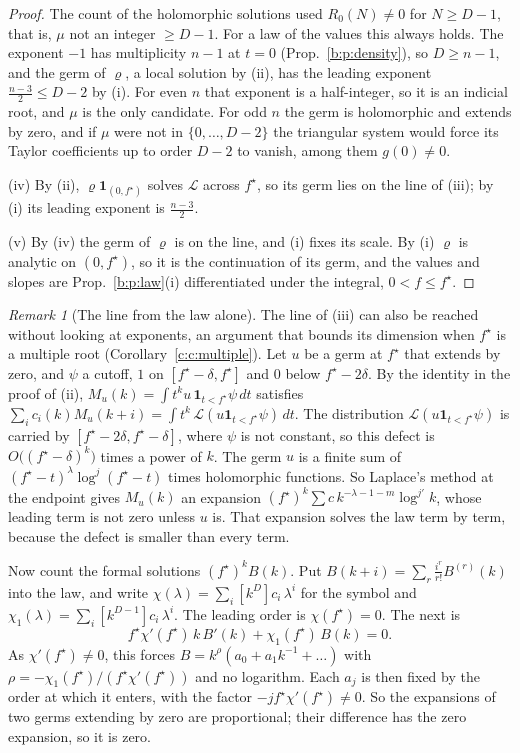 \documentclass[11pt]{article}
\newcommand{\one}{\mathbf 1}
\theoremstyle{plain}
\theoremstyle{definition}
\theoremstyle{remark}
\newtheorem{remark}[proposition]{Remark}
\begin{document}
\begin{proof}
The count of the holomorphic solutions used $R_0(N)\neq0$ for $N\ge D-1$, that is, $\mu$ not an integer $\ge D-1$. For a law of the values this always holds. The exponent $-1$ has multiplicity $n-1$ at $t=0$ (Prop.~\ref{b:p:density}), so $D\ge n-1$, and the germ of $\varrho$, a local solution by (ii), has the leading exponent $\frac{n-3}2\le D-2$ by (i). For even $n$ that exponent is a half-integer, so it is an indicial root, and $\mu$ is the only candidate. For odd $n$ the germ is holomorphic and extends by zero, and if $\mu$ were not in $\{0,\dots,D-2\}$ the triangular system would force its Taylor coefficients up to order $D-2$ to vanish, among them $g(0)\neq0$.

(iv) By (ii), $\varrho\one_{(0,f^\star)}$ solves $\mathcal L$ across $f^\star$, so its germ lies on the line of (iii); by (i) its leading exponent is $\frac{n-3}2$.

(v) By (iv) the germ of $\varrho$ is on the line, and (i) fixes its scale. By (i) $\varrho$ is analytic on $(0,f^\star)$, so it is the continuation of its germ, and the values and slopes are Prop.~\ref{b:p:law}(i) differentiated under the integral, $0<f\le f^\star$.
\end{proof}


\begin{remark}[The line from the law alone]\label{c:r:lawline}
The line of (iii) can also be reached without looking at exponents, an argument that bounds its dimension when $f^\star$ is a multiple root (Corollary~\ref{c:c:multiple}). Let $u$ be a germ at $f^\star$ that extends by zero, and $\psi$ a cutoff, $1$ on $[f^\star-\delta,f^\star]$ and $0$ below $f^\star-2\delta$. By the identity in the proof of (ii), $M_u(k)=\int t^ku\,\one_{t<f^\star}\psi\,dt$ satisfies $\sum_ic_i(k)M_u(k+i)=\int t^k\,\mathcal L(u\one_{t<f^\star}\psi)\,dt$. The distribution $\mathcal L(u\one_{t<f^\star}\psi)$ is carried by $[f^\star-2\delta,f^\star-\delta]$, where $\psi$ is not constant, so this defect is $O\big((f^\star-\delta)^k\big)$ times a power of $k$. The germ $u$ is a finite sum of $(f^\star-t)^\lambda\log^j(f^\star-t)$ times holomorphic functions. So Laplace's method at the endpoint gives $M_u(k)$ an expansion $(f^\star)^k\sum c\,k^{-\lambda-1-m}\log^{j'}k$, whose leading term is not zero unless $u$ is. That expansion solves the law term by term, because the defect is smaller than every term.

Now count the formal solutions $(f^\star)^kB(k)$. Put $B(k+i)=\sum_r\frac{i^r}{r!}B^{(r)}(k)$ into the law, and write $\chi(\lambda)=\sum_i[k^D]c_i\,\lambda^i$ for the symbol and $\chi_1(\lambda)=\sum_i[k^{D-1}]c_i\,\lambda^i$. The leading order is $\chi(f^\star)=0$. The next is
\[
f^\star\chi'(f^\star)\,k\,B'(k)+\chi_1(f^\star)\,B(k)=0 .
\]
As $\chi'(f^\star)\neq0$, this forces $B=k^\rho(a_0+a_1k^{-1}+\dots)$ with $\rho=-\chi_1(f^\star)/(f^\star\chi'(f^\star))$ and no logarithm. Each $a_j$ is then fixed by the order at which it enters, with the factor $-jf^\star\chi'(f^\star)\neq0$. So the expansions of two germs extending by zero are proportional; their difference has the zero expansion, so it is zero.
\end{remark}
\end{document}
